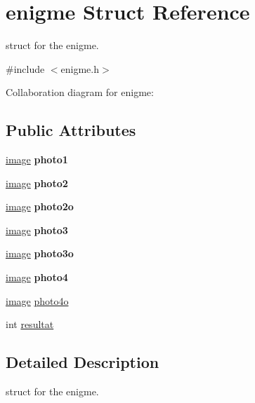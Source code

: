\hypertarget{structenigme}{}\section{enigme Struct Reference}
\label{structenigme}


struct for the enigme.  




{\ttfamily \#include $<$enigme.\+h$>$}



Collaboration diagram for enigme\+:
\subsection*{Public Attributes}
\begin{DoxyCompactItemize}
\item 
\mbox{\label{structenigme_ad51568d637a922130a5c77ae9cc85c04}} 
\hyperlink{structimage}{image} {\bfseries photo1}
\item 
\mbox{\label{structenigme_a0207519a85159b561e880e951993b663}} 
\hyperlink{structimage}{image} {\bfseries photo2}
\item 
\mbox{\label{structenigme_a88c918624602ff54f38d6d3c61a93a05}} 
\hyperlink{structimage}{image} {\bfseries photo2o}
\item 
\mbox{\label{structenigme_abbc8e697f8ab1380338b21dec7693d52}} 
\hyperlink{structimage}{image} {\bfseries photo3}
\item 
\mbox{\label{structenigme_a562205d4b854f30581fd2b056e6f28ab}} 
\hyperlink{structimage}{image} {\bfseries photo3o}
\item 
\mbox{\label{structenigme_a1656961e1ace9964e8dfb4b068fe5c8a}} 
\hyperlink{structimage}{image} {\bfseries photo4}
\item 
\hyperlink{structimage}{image} \hyperlink{structenigme_a0d67b3258c7bb0d5397190ccc98ea4f1}{photo4o}
\item 
int \hyperlink{structenigme_a70a6dded93ce208bd1d4e2be4ab5e6e4}{resultat}
\end{DoxyCompactItemize}


\subsection{Detailed Description}
struct for the enigme. 

